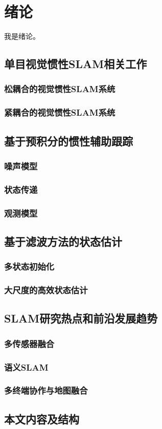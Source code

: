 \chapter{绪论}

我是绪论。

\section{单目视觉惯性SLAM相关工作}
\subsection{松耦合的视觉惯性SLAM系统}
\subsection{紧耦合的视觉惯性SLAM系统}

\section{基于预积分的惯性辅助跟踪}
\subsection{噪声模型}
\subsection{状态传递}
\subsection{观测模型}

\section{基于滤波方法的状态估计}



\subsection{多状态初始化}
\subsection{大尺度的高效状态估计}

\section{SLAM研究热点和前沿发展趋势}
\subsection{多传感器融合}
\subsection{语义SLAM}
\subsection{多终端协作与地图融合}

\section{本文内容及结构}
